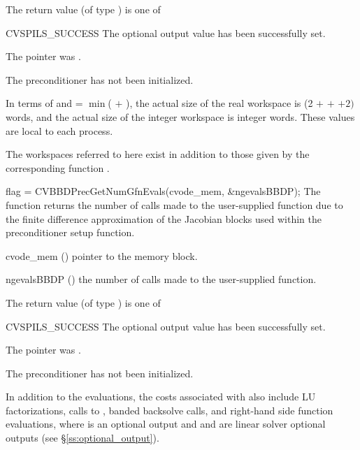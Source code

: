 {
  The return value  (of type ) is one of
  \begin{args}
  \item[CVSPILS\_SUCCESS] 
    The optional output value has been successfully set.
  \item[\id{CVSPILS\_MEM\_NULL}] 
    The  pointer was .
  \item[\Id{CVSPILS\_PMEM\_NULL}]
    The {\cvbbdpre} preconditioner has not been initialized.
  \end{args}
}
{
  In terms of  and
   = $\min$( $+$ ),
  the actual size of the real workspace is
  (2  $+$  $+$  $+2) \, $
   words, and the actual size of the integer workspace is
   integer words.  These values are local to each process.

  The workspaces referred to here exist in addition to those given by the
  corresponding function .
}
{
  flag = CVBBDPrecGetNumGfnEvals(cvode\_mem, \&ngevalsBBDP);
}
{
  The function  returns the
  number of calls made to the user-supplied  function due to the 
  finite difference approximation of the Jacobian blocks used within
  the preconditioner setup function.
}
{
  \begin{args}[ngevalsBBDP]
  \item[cvode\_mem] ()
    pointer to the {\cvodes} memory block.
  \item[ngevalsBBDP] ()
    the number of calls made to the user-supplied  function.
  \end{args}
}
{
  The return value  (of type ) is one of
  \begin{args}
  \item[CVSPILS\_SUCCESS] 
    The optional output value has been successfully set.
  \item[\id{CVSPILS\_MEM\_NULL}] 
    The  pointer was .
  \item[\Id{CVSPILS\_PMEM\_NULL}]
    The {\cvbbdpre} preconditioner has not been initialized.
  \end{args}
}
{}

In addition to the   evaluations,
the costs associated with {\cvbbdpre} also include  LU
factorizations,  calls to ,  banded
backsolve calls, and  right-hand side function evaluations,
where  is an optional {\cvodes} output and  and 
 are linear solver optional outputs (see \S\ref{ss:optional_output}).
